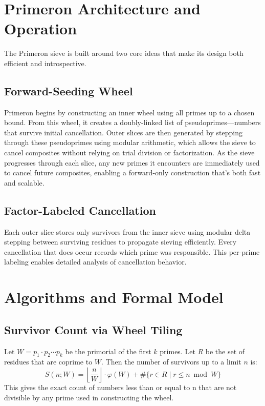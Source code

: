 \newpage
\section{Primeron Architecture and Operation}
The Primeron sieve is built around two core ideas that make its design both efficient and introspective.

\subsection*{Forward-Seeding Wheel}
Primeron begins by constructing an inner wheel using all primes up to a chosen bound. From this wheel, it creates a doubly-linked list of pseudoprimes—numbers that survive initial cancellation. Outer slices are then generated by stepping through these pseudoprimes using modular arithmetic, which allows the sieve to cancel composites without relying on trial division or factorization. As the sieve progresses through each slice, any new primes it encounters are immediately used to cancel future composites, enabling a forward-only construction that’s both fast and scalable.

\subsection*{Factor-Labeled Cancellation}
Each outer slice stores only survivors from the inner sieve using modular delta stepping between surviving residues to propagate sieving efficiently. Every cancellation that does occur records which prime was responsible. This per-prime labeling enables detailed analysis of cancellation behavior.

\section{Algorithms and Formal Model}

\subsection{Survivor Count via Wheel Tiling}
Let \( W = p_1 \cdot p_2 \cdots p_k \) be the primorial of the first \( k \) primes.  Let \( R \) be the set of residues that are coprime to \( W \). Then the number of survivors up to a limit \( n \) is:
\[
S(n; W) = \left\lfloor \frac{n}{W} \right\rfloor \cdot \varphi(W) + \#\{ r \in R \mid r \leq n \bmod W \}
\]
This gives the exact count of numbers less than or equal to n that are not divisible by any prime used in constructing the wheel.

